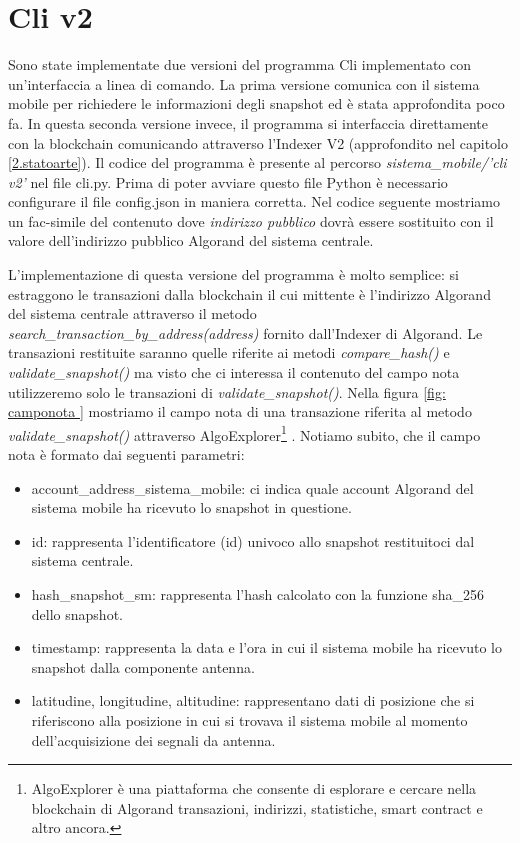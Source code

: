 \section{Cli v2}
Sono state implementate due versioni del programma Cli implementato con un'interfaccia a linea di comando. La prima versione comunica con il sistema mobile per richiedere le informazioni degli snapshot ed è stata approfondita poco fa. In questa seconda versione invece, il programma si interfaccia direttamente con la blockchain comunicando attraverso l'Indexer V2 (approfondito nel capitolo \ref{2.statoarte}). Il codice del programma è presente al percorso \textit{sistema\_mobile/'cli v2'} nel file cli.py. Prima di poter avviare questo file Python è necessario configurare il file config.json in maniera corretta. Nel codice seguente mostriamo un fac-simile del contenuto dove \textit{indirizzo pubblico} dovrà essere sostituito con il valore dell'indirizzo pubblico Algorand del sistema centrale.

L'implementazione di questa versione del programma è molto semplice: si estraggono le transazioni dalla blockchain il cui mittente è l'indirizzo Algorand del sistema centrale attraverso il metodo \textit{search\_transaction\_by\_address(address)} fornito dall'Indexer di Algorand. Le transazioni restituite saranno quelle riferite ai metodi \textit{compare\_hash()} e \textit{validate\_snapshot()} ma visto che ci interessa il  contenuto del campo nota utilizzeremo solo le transazioni di \textit{validate\_snapshot()}. Nella figura \ref{fig: camponota } mostriamo il campo nota  di una transazione riferita al metodo \textit{validate\_snapshot()} attraverso AlgoExplorer\footnote{AlgoExplorer è una piattaforma che consente di esplorare e cercare nella blockchain di Algorand transazioni, indirizzi, statistiche, smart contract e altro ancora.} \cite{algoexplorer}. Notiamo subito, che il campo nota è formato dai seguenti parametri:
\begin{itemize}
    \item account\_address\_sistema\_mobile: ci indica quale account Algorand del sistema mobile ha ricevuto lo snapshot in questione.
    \item id: rappresenta l'identificatore (id) univoco allo snapshot restituitoci dal sistema centrale.
    \item hash\_snapshot\_sm: rappresenta l'hash calcolato con la funzione sha\_256 dello snapshot.
    \item timestamp: rappresenta la data e l'ora in cui il sistema mobile ha ricevuto lo snapshot dalla componente antenna.
    \item latitudine, longitudine, altitudine: rappresentano dati di posizione che si riferiscono alla posizione in cui si trovava il sistema mobile al momento dell'acquisizione dei segnali da antenna.
\end{itemize}
